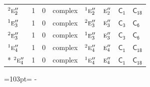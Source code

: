 \documentclass[10pt,a4paper]{article}
\newcommand{\needspace}[1]{\par\penalty-100\begingroup\dimen0=#1\relax\dimen2=\pagegoal
  \advance\dimen2-\pagetotal\ifdim\dimen0>\dimen2\relax\ifdim\dimen2>0pt\vfil\break\fi\fi
  \endgroup}
\numberwithin{equation}{section}
\newcommand{\grp}[1]{\mathsf{#1}}
\newcommand{\irr}[1]{\text{\normalfont\scshape #1}}
\newcommand{\conjpair}[1]{{}^{#1}}
\begin{document}
{\begin{longtable}{@{}lrrlllll@{}}
$\conjpair{2}\irr{e}_{2}''$ & 1 & $0$ & complex & $\conjpair{1}\irr{e}_{2}''$ & $\irr{e}_{2}''$ & \href{C1.pdf}{$\grp{C_{1}}$} & $\grp{C_{18}}$\\
$\conjpair{1}\irr{e}_{3}''$ & 1 & $0$ & complex & $\conjpair{2}\irr{e}_{3}''$ & $\irr{e}_{3}''$ & \href{C3.pdf}{$\grp{C_{3}}$} & \href{C6.pdf}{$\grp{C_{6}}$}\\
$\conjpair{2}\irr{e}_{3}''$ & 1 & $0$ & complex & $\conjpair{1}\irr{e}_{3}''$ & $\irr{e}_{3}''$ & \href{C3.pdf}{$\grp{C_{3}}$} & \href{C6.pdf}{$\grp{C_{6}}$}\\
$\conjpair{1}\irr{e}_{4}''$ & 1 & $0$ & complex & $\conjpair{2}\irr{e}_{4}''$ & $\irr{e}_{4}''$ & \href{C1.pdf}{$\grp{C_{1}}$} & $\grp{C_{18}}$\\*
$\conjpair{2}\irr{e}_{4}''$ & 1 & $0$ & complex & $\conjpair{1}\irr{e}_{4}''$ & $\irr{e}_{4}''$ & \href{C1.pdf}{$\grp{C_{1}}$} & $\grp{C_{18}}$\\
\bottomrule\end{longtable}}
\needspace{103pt}
\end{document}
